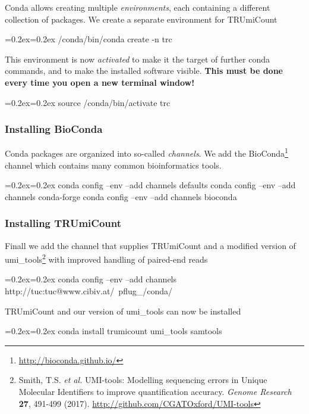 \documentclass{scrartcl}
\newenvironment{shellcode}%
   {\bgroup\topsep=0.2ex\partopsep=0.2ex\shaded\verbatim}%
   {\endverbatim\endshaded\egroup}
\begin{document}
Conda allows creating multiple \emph{environments}, each containing a different collection of packages. We create a separate environment for TRUmiCount

\begin{shellcode}
/conda/bin/conda create -n trc
\end{shellcode}

This environment is now \emph{activated} to make it the target of further conda commands, and to make the installed software visible. \textbf{This must be done every time you open a new terminal window!}

\begin{shellcode}
source /conda/bin/activate trc
\end{shellcode}
\subsubsection*{Installing BioConda}

Conda packages are organized into so-called \emph{channels}. We add the BioConda\footnote{\url{http://bioconda.github.io/}} channel which contains many common bioinformatics tools.

\begin{shellcode}
conda config --env --add channels defaults
conda config --env --add channels conda-forge
conda config --env --add channels bioconda
\end{shellcode}

\subsubsection*{Installing TRUmiCount}

Finall we add the channel that supplies TRUmiCount and a modified version of umi\_tools\footnote{Smith, T.S. \textit{et al.} UMI-tools: Modelling sequencing errors in Unique Molecular Identifiers to improve quantification accuracy. \textit{Genome Research} \textbf{27}, 491-499 (2017). \url{http://github.com/CGATOxford/UMI-tools}} with improved handling of paired-end reads

\begin{shellcode}
conda config --env --add channels http://tuc:tuc@www.cibiv.at/~pflug_/conda/
\end{shellcode}

TRUmiCount and our version of umi\_tools can now be installed

\begin{shellcode}
conda install trumicount umi_tools samtools
\end{shellcode}
\end{document}
